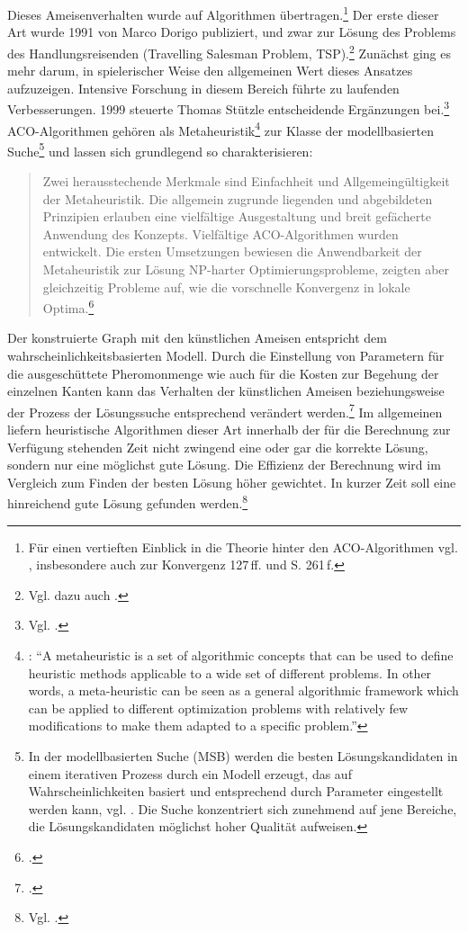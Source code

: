 Dieses Ameisenverhalten wurde auf Algorithmen übertragen.\footnote{Für einen
vertieften Einblick in die Theorie hinter den ACO-Algorithmen vgl. \citet*[S.
121\,ff.]{ds-ant}, insbesondere auch zur Konvergenz 127\,ff. und S. 261\,f.} Der
erste dieser Art wurde 1991 von Marco Dorigo publiziert, und zwar zur Lösung des
Problems des Handlungsreisenden (Travelling Salesman Problem, TSP).\footnote{Vgl.
dazu auch \citet*[S. 65\,ff.]{ds-ant}.} Zunächst ging es mehr darum, in
spielerischer Weise den allgemeinen Wert dieses Ansatzes aufzuzeigen. Intensive
Forschung in diesem Bereich führte zu laufenden Verbesserungen. 1999 steuerte
Thomas Stützle entscheidende Ergänzungen bei.\footnote{Vgl. \citet*{ds-ant,
wiki-antalg}.} ACO-Algorithmen gehören als Metaheuristik\footnote{\citet*[S.
62]{ds-ant}: \enquote{A metaheuristic is a set of algorithmic concepts that can
be used to define heuristic methods applicable to a wide set of different
problems. In other words, a meta-heuristic can be seen as a general algorithmic
framework which can be applied to different optimization problems with
relatively few modifications to make them adapted to a specific problem.}} zur
Klasse der modellbasierten Suche\footnote{In der modellbasierten Suche (MSB)
werden die besten Lösungskandidaten in einem iterativen Prozess durch ein Modell
erzeugt, das auf Wahrscheinlichkeiten basiert und entsprechend durch Parameter
eingestellt werden kann, vgl. \citet*[S. 138\,ff.]{ds-ant}. Die Suche
konzentriert sich zunehmend auf jene Bereiche, die Lösungskandidaten möglichst
hoher Qualität aufweisen.} und lassen sich grundlegend so charakterisieren:
\blockquote{Zwei herausstechende Merkmale sind Einfachheit und
Allgemeingültigkeit der Metaheuristik. Die allgemein zugrunde liegenden und
abgebildeten Prinzipien erlauben eine vielfältige Ausgestaltung und breit
gefächerte Anwendung des Konzepts. Vielfältige ACO-Algorithmen wurden
entwickelt. Die ersten Umsetzungen bewiesen die Anwendbarkeit der Metaheuristik
zur Lösung NP-harter Optimierungsprobleme, zeigten aber gleichzeitig Probleme
auf, wie die vorschnelle Konvergenz in lokale Optima.\footnote{\citet*[S.
19]{sch-koa}.}}

\noindent Der konstruierte Graph mit den künstlichen Ameisen entspricht dem
wahrscheinlichkeitsbasierten Modell. Durch die Einstellung von Parametern für
die ausgeschüttete Pheromonmenge wie auch für die Kosten zur Begehung der
einzelnen Kanten kann das Verhalten der künstlichen Ameisen beziehungsweise der
Prozess der Lösungssuche entsprechend verändert
werden.\footnote{\citet*[Vgl.][S. 151]{ds-ant}.} Im allgemeinen liefern
heuristische Algorithmen dieser Art innerhalb der für die Berechnung zur
Verfügung stehenden Zeit nicht zwingend eine oder gar die korrekte Lösung,
sondern nur eine möglichst gute Lösung. Die Effizienz der Berechnung wird im
Vergleich zum Finden der besten Lösung höher gewichtet. In kurzer Zeit soll eine
hinreichend gute Lösung gefunden werden.\footnote{Vgl. \citet*[S.
25\,ff.]{ds-ant}.}

